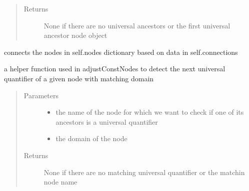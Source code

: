 \documentclass[letterpaper,10pt,english,openany,oneside]{sphinxmanual}
\begin{document}
\begin{fulllineitems}
\begin{fulllineitems}
\begin{quote}
\begin{description}
\item[{Returns}] \leavevmode
None if there are no universal ancestors or the first universal ancestor node object

\end{description}\end{quote}

\end{fulllineitems}


\begin{fulllineitems}
\label{\detokenize{index:parser.Parser.connectNodes}}
connects the nodes in self.nodes dictionary based on data in self.connections

\end{fulllineitems}


\begin{fulllineitems}
\label{\detokenize{index:parser.Parser.nextMatchingForAll}}
a helper function used in adjustConstNodes to detect the next universal quantifier of a given node with matching domain
\begin{quote}\begin{description}
\item[{Parameters}] \leavevmode\begin{itemize}
\item {} 
 \textendash{} the name of the node for which we want to check if one of its ancestors is a universal quantifier

\item {} 
 \textendash{} the domain of the node

\end{itemize}

\item[{Returns}] \leavevmode
None if there are no matching universal quantifier or the matchin node name

\end{description}\end{quote}


\end{fulllineitems}
\end{fulllineitems}
\end{document}
